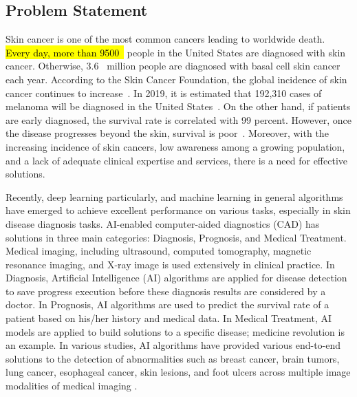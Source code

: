 \documentclass[sensors,article,accept,pdftex,moreauthors]{Definitions/mdpi}
\begin{document}
	\subsection{Problem Statement}
	{Skin cancer is one of the most common cancers leading to worldwide death. \hl{Every day, more than 9500~\mbox{\cite{03358}} }%
	people in the United States are diagnosed with skin cancer. Otherwise, 3.6~\mbox{\cite{03358}} million people are diagnosed with basal cell skin cancer each year. According to the Skin Cancer Foundation, the global incidence of skin cancer continues to increase~\mbox{\cite{11872}}. In 2019, it is estimated that 192,310 cases of melanoma will be diagnosed in the United States~\mbox{\cite{11872}}. On the other hand, if patients are early diagnosed, the survival rate is correlated with 99 percent. However, once the disease progresses beyond the skin, survival is poor~\mbox{\cite{11872}}. Moreover, with the increasing incidence of skin cancers, low awareness among a growing population, and a lack of adequate clinical expertise and services, there is a need for effective solutions.} 
	
	Recently, deep learning particularly, and machine learning in general algorithms have emerged to achieve excellent performance on various tasks, especially in skin disease diagnosis tasks. AI-enabled computer-aided diagnostics (CAD)\cite{11797} has solutions in three main categories: Diagnosis, Prognosis, and Medical Treatment. Medical imaging, including ultrasound, computed tomography, magnetic resonance imaging, and X-ray image is used extensively in clinical practice. In Diagnosis, Artificial Intelligence (AI) algorithms are applied for disease detection to save progress execution before these diagnosis results are considered by a doctor. In Prognosis, AI algorithms are used to predict the survival rate of a patient based on his/her history and medical data. In Medical Treatment, AI models are applied to build solutions to a specific disease; medicine revolution is an example. In various studies, AI algorithms have provided various end-to-end solutions to the detection of abnormalities such as breast cancer, brain tumors, lung cancer, esophageal cancer, skin lesions, and foot ulcers across multiple image modalities of medical imaging \cite{11872}.
	
\end{document}
